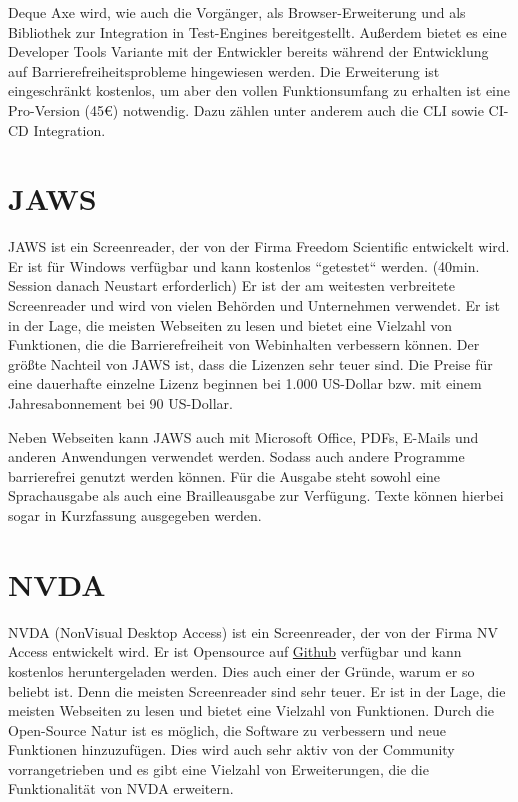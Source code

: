 Deque Axe wird, wie auch die Vorgänger, als Browser-Erweiterung und als Bibliothek zur Integration in Test-Engines bereitgestellt. Außerdem bietet es eine Developer Tools Variante mit der Entwickler bereits während der Entwicklung auf Barrierefreiheitsprobleme hingewiesen werden. Die Erweiterung ist eingeschränkt kostenlos, um aber den vollen Funktionsumfang zu erhalten ist eine Pro-Version (45€) notwendig. Dazu zählen unter anderem auch die CLI sowie CI-CD Integration.

\section{JAWS}
\label{sec:a11yToolsJAWS}

JAWS ist ein Screenreader, der von der Firma Freedom Scientific entwickelt wird. Er ist für Windows verfügbar und kann kostenlos ``getestet`` werden. (40min. Session danach Neustart erforderlich) Er ist der am weitesten verbreitete Screenreader und wird von vielen Behörden und Unternehmen verwendet. Er ist in der Lage, die meisten Webseiten zu lesen und bietet eine Vielzahl von Funktionen, die die Barrierefreiheit von Webinhalten verbessern können. Der größte Nachteil von JAWS ist, dass die Lizenzen sehr teuer sind. Die Preise für eine dauerhafte einzelne Lizenz beginnen bei 1.000 US-Dollar bzw. mit einem Jahresabonnement bei 90 US-Dollar.

Neben Webseiten kann JAWS auch mit Microsoft Office, PDFs, E-Mails und anderen Anwendungen verwendet werden. Sodass auch andere Programme barrierefrei genutzt werden können. Für die Ausgabe steht sowohl eine Sprachausgabe als auch eine Brailleausgabe zur Verfügung. Texte können hierbei sogar in Kurzfassung ausgegeben werden.

\section{NVDA}
\label{sec:a11yToolsNVDA}

NVDA (NonVisual Desktop Access) ist ein Screenreader, der von der Firma NV Access entwickelt wird. Er ist Opensource auf \href{https://github.com/nvaccess/nvda/}{Github} verfügbar und kann kostenlos heruntergeladen werden. Dies auch einer der Gründe, warum er so beliebt ist. Denn die meisten Screenreader sind sehr teuer. Er ist in der Lage, die meisten Webseiten zu lesen und bietet eine Vielzahl von Funktionen. Durch die Open-Source Natur ist es möglich, die Software zu verbessern und neue Funktionen hinzuzufügen. Dies wird auch sehr aktiv von der Community vorrangetrieben und es gibt eine Vielzahl von Erweiterungen, die die Funktionalität von NVDA erweitern.